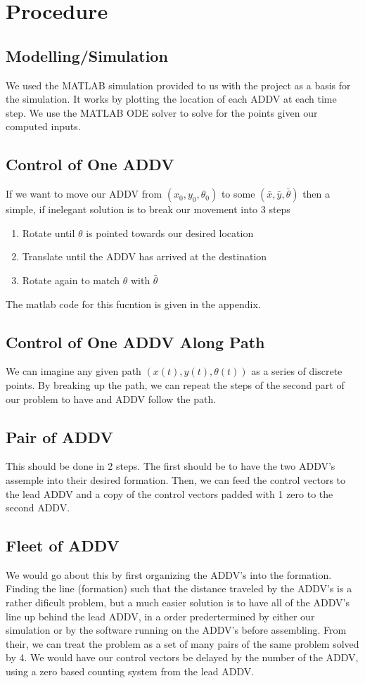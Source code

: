 \documentclass[journal]{IEEEtran}
\begin{document}
\section{Procedure}
\subsection{Modelling/Simulation}
We used the MATLAB simulation provided to us with the project as a basis for the simulation. 
It works by plotting the location of each ADDV at each time step. We use the MATLAB ODE
solver to solve for the points given our computed inputs. 
\subsection{Control of One ADDV}
If we want to move our ADDV from $(x_0, y_0, \theta_0)$ to some $(\bar{x}, \bar{y}, \bar{\theta})$ 
then a simple, if inelegant solution is to break our movement into 3 steps
\begin{enumerate}
    \item Rotate until $\theta$ is pointed towards our desired location
    \item Translate until the ADDV has arrived at the destination
    \item Rotate again to match $\theta$ with $\bar\theta$
\end{enumerate}
The matlab code for this fucntion is given in the appendix.
\subsection{Control of One ADDV Along Path}
We can imagine any given path $(x(t), y(t), \theta(t))$ as a series of discrete points. 
By breaking up the path, we can repeat the steps of the second part of our problem to 
have and ADDV follow the path.
\subsection{Pair of ADDV}
This should be done in 2 steps. The first should be to have the two ADDV's assemple into their desired formation.
Then, we can feed the control vectors to the lead ADDV and a copy of the control vectors padded with 1 zero to the second ADDV. 
\subsection{Fleet of ADDV}
We would go about this by first organizing the ADDV's into the formation. 
Finding the line (formation) such that the distance traveled by the ADDV's
is a rather dificult problem, but a much easier solution is to have all of the ADDV's
line up behind the lead ADDV, in a order predertermined by either our simulation
or by the software running on the ADDV's before assembling. From their, we can
treat the problem as a set of many pairs of the same problem solved by 4. We 
would have our control vectors be delayed by the number of the ADDV, using 
a zero based counting system from the lead ADDV.
\end{document}
